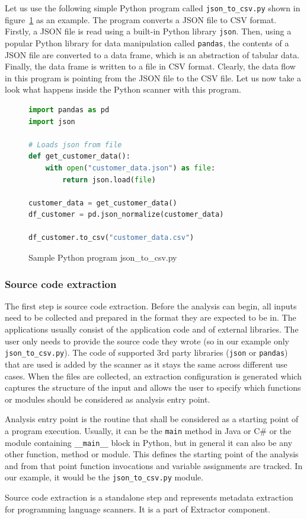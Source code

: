 Let us use the following simple Python program called \texttt{json\_to\_csv.py} shown in figure~\ref{fig:pythonSample} as an example. The program converts a JSON file to CSV format. Firstly, a JSON file is read using a built-in Python library \texttt{json}. Then, using a popular Python library for data manipulation called \texttt{pandas}, the contents of a JSON file are converted to a data frame, which is an abstraction of tabular data. Finally, the data frame is written to a file in CSV format. Clearly, the data flow in this program is pointing from the JSON file to the CSV file. Let us now take a look what happens inside the Python scanner with this program.

\begin{figure}[ht]
\begin{lstlisting}[language=Python] 
import pandas as pd
import json

# Loads json from file
def get_customer_data():
    with open("customer_data.json") as file:
        return json.load(file)

customer_data = get_customer_data()
df_customer = pd.json_normalize(customer_data)

df_customer.to_csv("customer_data.csv")
\end{lstlisting}
\caption{Sample Python program json\_to\_csv.py}
\label{fig:pythonSample}
\end{figure}

\subsubsection{Source code extraction}

The first step is source code extraction. Before the analysis can begin, all inputs need to be collected and prepared in the format they are expected to be in. The applications usually consist of the application code and of external libraries. The user only needs to provide the source code they wrote (so in our example only \texttt{json\_to\_csv.py}). The code of supported 3rd party libraries (\texttt{json} or \texttt{pandas}) that are used is added by the scanner as it stays the same across different use cases. When the files are collected, an extraction configuration is generated which captures the structure of the input and allows the user to specify which functions or modules should be considered as analysis entry point.
\par
Analysis entry point is the routine that shall be considered as a starting point of a program execution. Usually, it can be the \texttt{main} method in Java or C\# or the module containing \texttt{\_\_main\_\_} block in Python, but in general it can also be any other function, method or module. This defines the starting point of the analysis and from that point function invocations and variable assignments are tracked. In our example, it would be the \texttt{json\_to\_csv.py} module.
\par
Source code extraction is a standalone step and represents metadata extraction for programming language scanners. It is a part of Extractor component.

